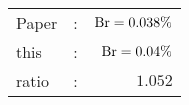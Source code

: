       \begin{tabular}{lcr}
          Paper &:& $\mathrm{Br}  = 0.038\%$ \\
          this      &:& $\mathrm{Br}  = 0.04\%$ \\
		  ratio   &:& $1.052$ \\
      \end{tabular}
